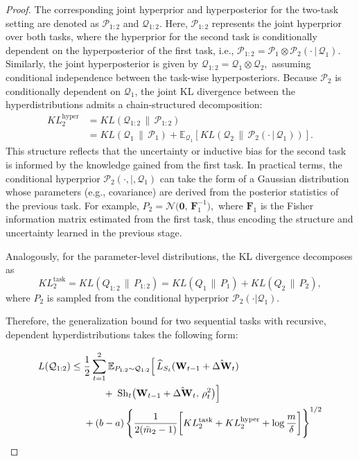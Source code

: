 \documentclass[letterpaper]{article} %
\begin{document}
\begin{proof}
The corresponding joint hyperprior and hyperposterior for the two-task setting are denoted as $\mathcal{P}_{1:2}$ and $\mathcal{Q}_{1:2}$. Here, $\mathcal{P}_{1:2}$ represents the joint hyperprior over both tasks, where the hyperprior for the second task is conditionally dependent on the hyperposterior of the first task, i.e.,
$\mathcal{P}_{1:2} = \mathcal{P}_1 \otimes \mathcal{P}_2(\cdot\,|\,\mathcal{Q}_1).$
Similarly, the joint hyperposterior is given by
$\mathcal{Q}_{1:2} = \mathcal{Q}_1 \otimes \mathcal{Q}_2,$
assuming conditional independence between the task-wise hyperposteriors. Because $\mathcal{P}_2$ is conditionally dependent on $\mathcal{Q}_1$, the joint KL divergence between the hyperdistributions admits a chain-structured decomposition:
\begin{equation}
\begin{aligned}
    KL^{\text{hyper}}_2&=KL(\mathcal{Q}_{1:2}\,\|\,\mathcal{P}_{1:2})  \\
    &= KL(\mathcal{Q}_1\,\|\,\mathcal{P}_1) + \mathbb{E}_{\mathcal{Q}_1}\left[ KL(\mathcal{Q}_2\,\|\,\mathcal{P}_2(\cdot\,|\,\mathcal{Q}_1)) \right].
\end{aligned}
\end{equation}
This structure reflects that the uncertainty or inductive bias for the second task is informed by the knowledge gained from the first task. In practical terms, the conditional hyperprior $\mathcal{P}_2(\cdot,|,\mathcal{Q}_1)$ can take the form of a Gaussian distribution whose parameters (e.g., covariance) are derived from the posterior statistics of the previous task. For example,
$P_2 = \mathcal{N}\big(\mathbf{0},\, \mathbf{F}_1^{-1}\big),$
where $\mathbf{F}_1$ is the Fisher information matrix estimated from the first task, thus encoding the structure and uncertainty learned in the previous stage.


Analogously, for the parameter-level distributions, the KL divergence decomposes as
\begin{equation}
    KL^{\text{task}}_2=KL(Q_{1:2}\,\|\,P_{1:2}) = KL(Q_1\,\|\,P_1) + KL(Q_2\,\|\,P_2),
\end{equation}
where $P_2$ is sampled from the conditional hyperprior $\mathcal{P}_2(\cdot|\mathcal{Q}_1)$.



Therefore, the generalization bound for two sequential tasks with recursive, dependent hyperdistributions takes the following form:

\begin{align}
L(\mathcal{Q}_{1:2}) \leq\; & \frac{1}{2} \sum_{t=1}^2 
    \mathbb{E}_{P_{1:2} \sim \mathcal{Q}_{1:2}} 
    \Big[\, 
        \widehat{L}_{S_t}(\mathbf{W}_{t-1} + \hat{\Delta\mathbf{W}}_t)
    \notag \\
& \qquad 
    +\; \mathrm{Sh}_t\big(\mathbf{W}_{t-1} + \hat{\Delta\mathbf{W}}_t,\, \rho_t^2\big)
    \Big] \notag \\
& + (b-a)\, 
    \Bigg\{ \frac{1}{2(\bar{m}_2 - 1)} \bigg[
        KL^{\text{task}}_2 + KL^{\text{hyper}}_2 + \log\frac{m}{\delta}
    \bigg] \Bigg\}^{1/2}
\label{eq:cl-bound-chain-compact}
\end{align}


\end{proof}
\end{document}

